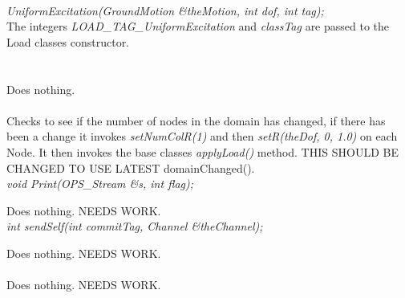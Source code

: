  \\ 
{\em UniformExcitation(GroundMotion \&theMotion, int dof, int tag);}\\ 

The integers {\em LOAD\_TAG\_UniformExcitation} and {\em classTag} are
passed to the Load classes constructor. \\

 \\
\\ 
Does nothing. \\

 \\ 
Checks to see if the number of nodes in the domain has changed, if
there has been a change it invokes {\em setNumColR(1)} and then 
{\em setR(theDof, 0, 1.0)} on each Node. It then invokes the base classes {\em
applyLoad()} method. THIS SHOULD BE CHANGED TO USE LATEST domainChanged().\\

{\em void Print(OPS_Stream \&s, int flag);}

Does nothing. NEEDS WORK. \\

{\em int sendSelf(int commitTag, Channel \&theChannel);}

Does nothing. NEEDS WORK. \\

\\
Does nothing. NEEDS WORK. 

